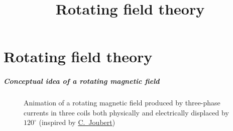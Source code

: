 \part{Rotating field theory}
\title[Rotating field theory]{Rotating field theory}  
\date{}  
\frame{\titlepage} 

\begin{frame}
	\frametitle{Conceptual idea of a rotating magnetic field}
    \begin{figure}
        \centering
        \caption{Animation of a rotating magnetic field produced by three-phase currents in three coils both physically and electrically displaced by $120^\circ$ (inspired by \href{https://perso.univ-lyon1.fr/charles.joubert/web_anim/simen_rotfield_create.html}{C.~Joubert})}
    \end{figure}
\end{frame}

